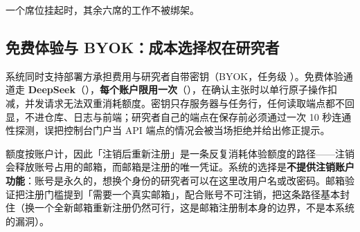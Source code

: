一个席位挂起时，其余六席的工作不被绑架。

\subsection{免费体验与 BYOK：成本选择权在研究者}

系统同时支持部署方承担费用与研究者自带密钥（BYOK，任务级 ）。免费体验通道走 \textbf{DeepSeek}（），\textbf{每个账户限用一次}（），在确认主张时以单行原子操作扣减，并发请求无法双重消耗额度。密钥只存服务器与任务行，任何读取端点都不回显，不进仓库、日志与前端；研究者自己的端点在保存前必须通过一次 10 秒连通性探测，误把控制台门户当 API 端点的情况会被当场拒绝并给出修正提示。

额度按账户计，因此「注销后重新注册」是一条反复消耗体验额度的路径——注销会释放账号占用的邮箱，而邮箱是注册的唯一凭证。系统的选择是\textbf{不提供注销账户功能}：账号是永久的，想换个身份的研究者可以在这里改用户名或改密码。邮箱验证把注册门槛提到「需要一个真实邮箱」，配合账号不可注销，把这条路径基本封住（换一个全新邮箱重新注册仍然可行，这是邮箱注册制本身的边界，不是本系统的漏洞）。
